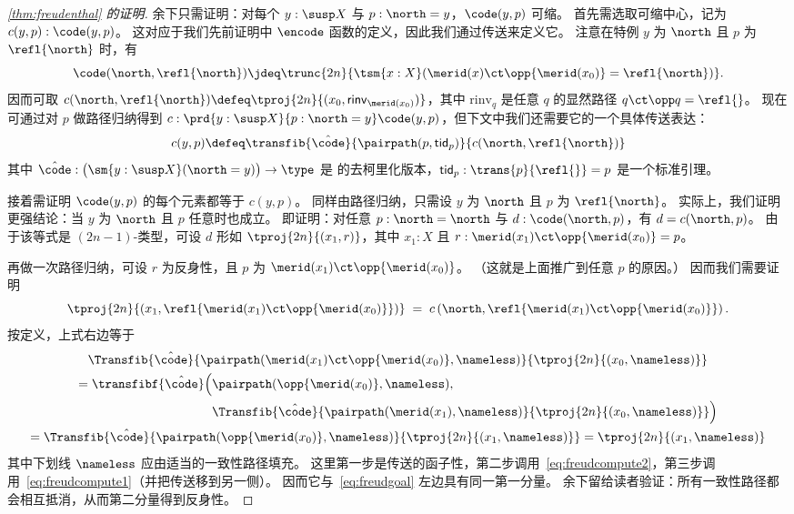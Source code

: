 \begin{proof}[\cref{thm:freudenthal} 的证明]
  余下只需证明：对每个 $y:\susp X$ 与 $p:\north=y$，$\code(y,p)$ 可缩。
  首先需选取可缩中心，记为 $c(y,p):\code(y,p)$。
  这对应于我们先前证明中 $\encode$ 函数的定义，因此我们通过传送来定义它。
  注意在特例 $y$ 为 $\north$ 且 $p$ 为 $\refl{\north}$ 时，有
  \[\code(\north,\refl{\north}) \jdeq \trunc{2n}{\tsm{x:X} (\merid(x) \ct \opp{\merid(x_0)} = \refl{\north})}.\]
  因而可取 $c(\north,\refl{\north})\defeq \tproj{2n}{(x_0,\mathsf{rinv}_{\merid(x_0)})}$，其中 $\mathrm{rinv}_q$ 是任意 $q$ 的显然路径 $q\ct\opp q = \refl{}$。
  现在可通过对 $p$ 做路径归纳得到 $c:\prd{y:\susp X}{p:\north=y} \code(y,p)$，但下文中我们还需要它的一个具体传送表达：
  \[ c(y,p) \defeq \transfib{\hat{\code}}{\pairpath(p,\mathsf{tid}_p)}{c(\north,\refl{\north})}
  \]
  其中 $\hat{\code}: \big(\sm{y:\susp X} (\north=y)\big) \to \type$ 是 \code 的去柯里化版本，$\mathsf{tid}_p:\trans{p}{\refl{}} = p$ 是一个标准引理。

  接着需证明 $\code(y,p)$ 的每个元素都等于 $c(y,p)$。
  同样由路径归纳，只需设 $y$ 为 $\north$ 且 $p$ 为 $\refl{\north}$。
  实际上，我们证明更强结论：当 $y$ 为 $\north$ 且 $p$ 任意时也成立。
  即证明：对任意 $p:\north=\north$ 与 $d:\code(\north,p)$，有 $d = c(\north,p)$。
  由于该等式是 $(2n-1)$-类型，可设 $d$ 形如 $\tproj{2n}{(x_1,r)}$，其中 $x_1:X$ 且 $r:\merid(x_1) \ct \opp{\merid(x_0)} = p$。

  再做一次路径归纳，可设 $r$ 为反身性，且 $p$ 为 $\merid(x_1) \ct \opp{\merid(x_0)}$。
  （这就是上面推广到任意 $p$ 的原因。）
  因而我们需要证明
  \begin{equation}
    \tproj{2n}{(x_1, \refl{\merid(x_1) \ct \opp{\merid(x_0)}})}
    \;=\;
    c\left(\north,\refl{\merid(x_1) \ct \opp{\merid(x_0)}}\right).\label{eq:freudgoal}
  \end{equation}
  按定义，上式右边等于
  \begin{multline*}
    \Transfib{\hat{\code}}{\pairpath(\merid(x_1) \ct \opp{\merid(x_0)}, \nameless)}{\tproj{2n}{(x_0,\nameless)}} \\
    = \transfibf{\hat{\code}}
    \begin{aligned}[t]
      \Big(
      &{\pairpath(\opp{\merid(x_0)}, \nameless)},\\
      &{\Transfib{\hat{\code}}{\pairpath(\merid(x_1), \nameless)}{\tproj{2n}{(x_0,\nameless)}}}
      \Big)
    \end{aligned}
    \\
    = \Transfib{\hat{\code}}{\pairpath(\opp{\merid(x_0)}, \nameless)}{\tproj{2n}{(x_1,\nameless)}}
    = \tproj{2n}{(x_1,\nameless)}
  \end{multline*}
  其中下划线 $\nameless$ 应由适当的一致性路径填充。
  这里第一步是传送的函子性，第二步调用~\eqref{eq:freudcompute2}，第三步调用~\eqref{eq:freudcompute1}（并把传送移到另一侧）。
  因而它与~\eqref{eq:freudgoal} 左边具有同一第一分量。
  余下留给读者验证：所有一致性路径都会相互抵消，从而第二分量得到反身性。
\end{proof}

